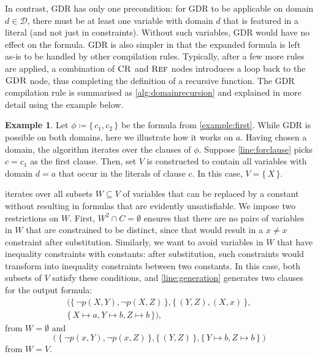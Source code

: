\documentclass[letterpaper]{article} %
\DeclareMathOperator{\CR}{\textsc{CR}}
\DeclareMathOperator{\GDR}{\textsc{GDR}}
\DeclareMathOperator{\Reff}{\textsc{Ref}}
\theoremstyle{definition}
\newtheorem{example}{Example}
\theoremstyle{remark}
\begin{document}
In contrast, GDR has only one precondition: for GDR to be applicable on domain
$d \in \mathcal{D}$, there must be at least one variable with domain $d$ that is
featured in a literal (and not just in constraints). Without such variables, GDR
would have no effect on the formula. GDR is also simpler in that the expanded
formula is left as-is to be handled by other compilation rules. Typically, after
a few more rules are applied, a combination of $\CR$ and $\Reff$ nodes
introduces a loop back to the $\GDR$ node, thus completing the definition of a
recursive function. The GDR compilation rule is summarised as
\cref{alg:domainrecursion} and explained in more detail using the example below.

\begin{example}
  Let $\phi \coloneqq \{\, c_1, c_2 \,\}$ be the formula from
  \cref{example:first}. While GDR is possible on both domains, here we
  illustrate how it works on $a$. Having chosen a domain, the algorithm iterates
  over the clauses of $\phi$. Suppose \cref{line:forclause} picks $c = c_1$ as
  the first clause. Then, set $V$ is constructed to contain all variables with
  domain $d = a$ that occur in the literals of clause $c$. In this case,
  $V = \{\, X \,\}$.

   iterates over all subsets $W \subseteq V$ of variables
  that can be replaced by a constant without resulting in formulas that are
  evidently unsatisfiable. We impose two restrictions on $W$. First,
  $W^2 \cap C = \emptyset$ ensures that there are no pairs of variables in $W$
  that are constrained to be distinct, since that would result in a $x \ne x$
  constraint after substitution. Similarly, we want to avoid variables in $W$
  that have inequality constraints with constants: after substitution, such
  constraints would transform into inequality constraints between two constants.
  In this case, both subsets of $V$ satisfy these conditions, and
  \cref{line:generation} generates two clauses for the output formula:
  \begin{multline*}
    (\{\, \neg p(X, Y), \neg p(X, Z) \,\}, \{\, (Y, Z), (X, x) \,\}, \\
    \{\, X \mapsto a, Y \mapsto b, Z \mapsto b \,\}),
  \end{multline*}
  from $W = \emptyset$ and
  \[
    (\{\, \neg p(x, Y), \neg p(x, Z) \,\}, \{\, (Y, Z) \,\}, \{\, Y \mapsto b, Z \mapsto b \,\})
  \]
  from $W = V$.


\end{example}
\end{document}
